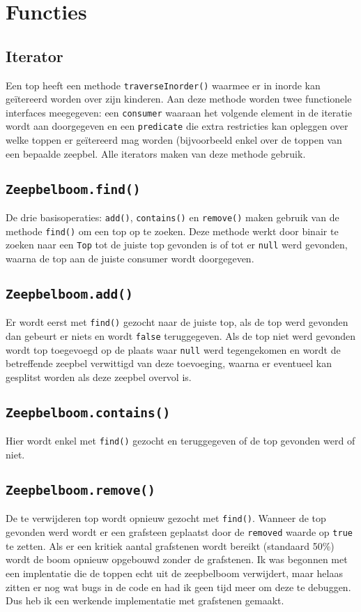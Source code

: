 \documentclass[12pt]{article}
\begin{document}
    \section{Functies}
    \subsection{Iterator}
    Een top heeft een methode {\tt traverseInorder()} waarmee er in inorde kan
    geïtereerd worden over zijn kinderen. Aan deze methode worden twee functionele
    interfaces meegegeven: een {\tt consumer} waaraan het volgende element in de iteratie
    wordt aan doorgegeven en een {\tt predicate} die extra restricties kan opleggen over
    welke toppen er geïtereerd mag worden (bijvoorbeeld enkel over de toppen van een
    bepaalde zeepbel.
    Alle iterators maken van deze methode gebruik.
    \subsection{\tt Zeepbelboom.find()}
    De drie basisoperaties: {\tt add()}, {\tt contains()} en {\tt remove()} maken gebruik
    van de methode {\tt find()} om een top op te zoeken. Deze methode werkt door binair
    te zoeken naar een {\tt Top} tot de juiste top gevonden is of tot er {\tt null} werd
    gevonden, waarna de top aan de juiste consumer wordt doorgegeven.
    \subsection{\tt Zeepbelboom.add()}
    Er wordt eerst met {\tt find()} gezocht naar de juiste top, als de top werd gevonden
    dan gebeurt er niets en wordt {\tt false} teruggegeven. Als de top niet werd gevonden
    wordt top toegevoegd op de plaats waar {\tt null} werd tegengekomen en wordt de
    betreffende zeepbel verwittigd van deze toevoeging, waarna er eventueel kan gesplitst
    worden als deze zeepbel overvol is.
    \subsection{\tt Zeepbelboom.contains()}
    Hier wordt enkel met {\tt find()} gezocht en teruggegeven of de top gevonden werd
    of niet.
    \subsection{\tt Zeepbelboom.remove()}
    De te verwijderen top wordt opnieuw gezocht met {\tt find()}. Wanneer de top gevonden
    werd wordt er een grafsteen geplaatst door de {\tt removed} waarde op {\tt true} te
    zetten. Als er een kritiek aantal grafstenen wordt bereikt (standaard 50\%) wordt
    de boom opnieuw opgebouwd zonder de grafstenen.
    \newline \newline
    Ik was begonnen met een implentatie die de toppen echt uit de zeepbelboom verwijdert,
    maar helaas zitten er nog wat bugs in de code en had ik geen tijd meer om deze te
    debuggen. Dus heb ik een werkende implementatie met grafstenen gemaakt.

    
    
    
\end{document}

